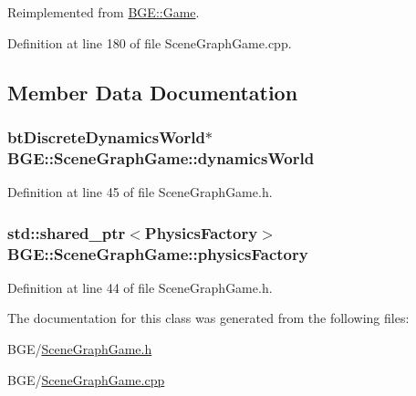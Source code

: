 Reimplemented from \hyperlink{class_b_g_e_1_1_game_a51ed573392d7bed791b67062e7c7a3d4}{B\-G\-E\-::\-Game}.



Definition at line 180 of file Scene\-Graph\-Game.\-cpp.



\subsection{Member Data Documentation}
\hypertarget{class_b_g_e_1_1_scene_graph_game_a45b47315f225ce7f276561108d6cb0e7}{
\subsubsection[{dynamics\-World}]{\setlength{\rightskip}{0pt plus 5cm}bt\-Discrete\-Dynamics\-World$\ast$ B\-G\-E\-::\-Scene\-Graph\-Game\-::dynamics\-World}}\label{class_b_g_e_1_1_scene_graph_game_a45b47315f225ce7f276561108d6cb0e7}


Definition at line 45 of file Scene\-Graph\-Game.\-h.

\hypertarget{class_b_g_e_1_1_scene_graph_game_a50dc4ff0c63594495ca6fc5fa4441603}{
\subsubsection[{physics\-Factory}]{\setlength{\rightskip}{0pt plus 5cm}std\-::shared\-\_\-ptr$<${\bf Physics\-Factory}$>$ B\-G\-E\-::\-Scene\-Graph\-Game\-::physics\-Factory}}\label{class_b_g_e_1_1_scene_graph_game_a50dc4ff0c63594495ca6fc5fa4441603}


Definition at line 44 of file Scene\-Graph\-Game.\-h.



The documentation for this class was generated from the following files\-:\begin{DoxyCompactItemize}
\item 
B\-G\-E/\hyperlink{_scene_graph_game_8h}{Scene\-Graph\-Game.\-h}\item 
B\-G\-E/\hyperlink{_scene_graph_game_8cpp}{Scene\-Graph\-Game.\-cpp}\end{DoxyCompactItemize}
